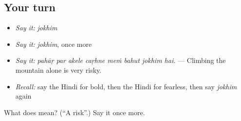 \subsection*{Your turn}
\begin{itemize}
\raggedright
  \item \emph{Say it:} \emph{jokhim}
  \item \emph{Say it:} \emph{jokhim}, once more
  \item \emph{Say it:} \emph{pahāṛ par akele caṛhne meṁ bahut jokhim hai.} — Climbing the mountain alone is very risky.
  \item \emph{Recall:} say the Hindi for bold, then the Hindi for fearless, then say \emph{jokhim} again
\end{itemize}

\begin{tcolorbox}[breakable,colback=teal!4,colframe=teal!35!black,title={Before you move on}]
What does  mean? (\textquotedblleft{}A risk\textquotedblright{}.) Say it once more.
\end{tcolorbox}
